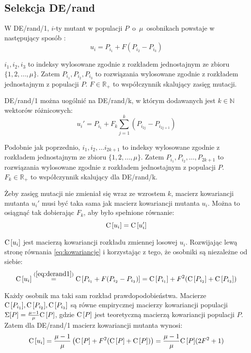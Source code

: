 \documentclass[a4paper,onecolumn,oneside,12pt,wide,floatssmall]{mwrep}
\def\C{{\rm C}\,}
\theoremstyle{definition}
\theoremstyle{plain}%
\theoremstyle{remark}
\begin{document}
\subsection{Selekcja DE/rand}
\label{chap:de_rand} 

W DE/rand/1, $i$-ty mutant w populacji $P$~o~$\mu$~osobnikach powstaje w następujący sposób 
\cite{decomposition}:
\begin{equation} \label{eq:derand1}
u_i = P_{i_1} + F(P_{i_2} - P_{i_3})
\end{equation}

$i_1, i_2, i_3$ to indeksy wylosowane zgodnie z rozkładem jednostajnym ze zbioru \\ 
$\{1, 2, \dots, \mu\}$. Zatem $P_{i_1}, P_{i_2}, P_{i_3}$ to rozwiązania wylosowane zgodnie z 
rozkładem jednostajnym z populacji $P$.
$F\in\mathbb{R_+}$ to współczynnik skalujący zasięg mutacji. 

DE/rand/1 można uogólnić na DE/rand/k, w którym dodawanych jest
$k \in \mathbb{N}$ wektorów różnicowych:
\begin{equation} \label{eq:derand}
u_i' = P_{i_1} + F_k\sum\limits_{j=1}^k (P_{i_{2j}} - P_{i_{2j+1}})
\end{equation}

Podobnie jak poprzednio, $i_1, i_2, \dots i_{2k+1}$ to indeksy wylosowane zgodnie z rozkładem jednostajnym ze zbioru 
$\{1, 2, \dots, \mu\}$. Zatem $P_{i_1}, P_{i_2}, \dots, P_{2k+1}$ to rozwiązania wylosowane zgodnie z rozkładem 
jednostajnym z populacji $P$. $F_k\in\mathbb{R_+}$ to współczynnik skalujący dla DE/rand/k. 

Żeby zasięg mutacji nie zmieniał się wraz ze wzrostem $k$, 
macierz kowariancji mutanta $u_i'$ musi być taka sama jak macierz kowariancji mutanta $u_i$.
Można to osiągnąć tak dobierając $F_k$, aby było spełnione równanie:
\begin{equation} \label{eq:kowariancje}
\C[u_i] = \C[u_i']
\end{equation}

$\C[u_i]$ jest macierzą kowariancji rozkładu zmiennej losowej $u_i$.
Rozwijając lewą stronę równania \eqref{eq:kowariancje} i korzystając z tego, że osobniki są niezależne od siebie:
\begin{align*}
\C[u_i] \overset{(\ref{eq:derand1})}{=} \C[P_{i_1} + F(P_{i_2} - P_{i_3})] = \C[P_{i_1}] + F^2(\C[P_{i_2}] + \C[P_{i_3}])
\end{align*}

Każdy osobnik ma taki sam rozkład prawdopodobieństwa. Macierze
$\C[P_{i_1}], \C[P_{i_2}], \C[P_{i_3}]$ są równe empirycznej macierzy kowariancji populacji 
$\Sigma[P] = \frac{\mu - 1}{\mu}\C[P]$, gdzie $\C[P]$ jest teoretyczną macierzą kowariancji
populacji $P$. Zatem dla DE/rand/1 macierz kowariancji mutanta wynosi:
\begin{equation} \label{eq:macierz_kow_mutanta}
\C[u_i] = \frac{\mu - 1}{\mu}\left(\C[P] + F^2(\C[P] + \C[P])\right) = \frac{\mu - 1}{\mu}\C[P](2F^2 + 1)
\end{equation}
\end{document}
